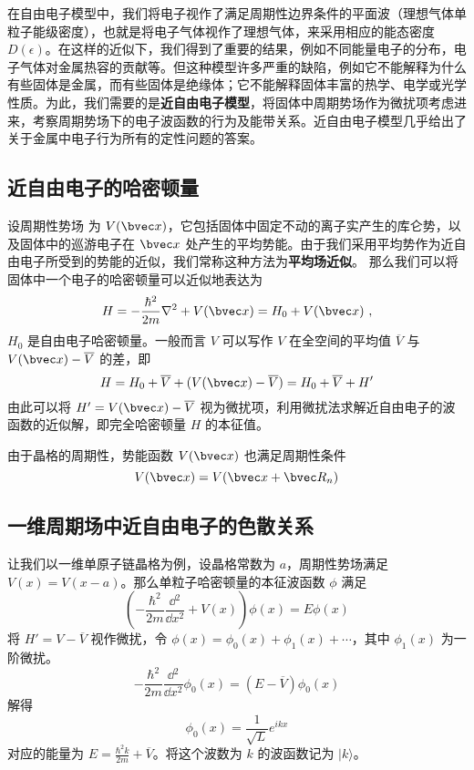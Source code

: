 

在自由电子模型中，我们将电子视作了满足周期性边界条件的平面波（理想气体单粒子能级密度），也就是将电子气体视作了理想气体，来采用相应的能态密度 $D(\epsilon)$。在这样的近似下，我们得到了重要的结果，例如不同能量电子的分布，电子气体对金属热容的贡献等。但这种模型许多严重的缺陷，例如它不能解释为什么有些固体是金属，而有些固体是绝缘体；它不能解释固体丰富的热学、电学或光学性质。为此，我们需要的是\textbf{近自由电子模型}，将固体中周期势场作为微扰项考虑进来，考察周期势场下的电子波函数的行为及能带关系。近自由电子模型几乎给出了关于金属中电子行为所有的定性问题的答案。
\subsection{近自由电子的哈密顿量}
设周期性势场 为 $V(\bvec x)$，它包括固体中固定不动的离子实产生的库仑势，以及固体中的巡游电子在 $\bvec x$ 处产生的平均势能。由于我们采用平均势作为近自由电子所受到的势能的近似，我们常称这种方法为\textbf{平均场近似}。
那么我们可以将固体中一个电子的哈密顿量可以近似地表达为
\begin{equation}
H=-\frac{\hbar^2}{2m}\nabla^2+V(\bvec x)=H_0+V(\bvec x)~,
\end{equation}
$H_0$ 是自由电子哈密顿量。一般而言 $V$ 可以写作 $V$ 在全空间的平均值 $\overline V$ 与 $V(\bvec x)-\overline V$ 的差，即
\begin{equation}
H=H_0+\overline V+(V(\bvec x)-\overline V)=H_0+\overline V+H'
\end{equation}
由此可以将 $H'=V(\bvec x)-\overline V$ 视为微扰项，利用微扰法求解近自由电子的波函数的近似解，即完全哈密顿量 $H$ 的本征值。

由于晶格的周期性，势能函数 $V(\bvec x)$ 也满足周期性条件
\begin{equation}
V(\bvec x)=V(\bvec x+\bvec R_n)
\end{equation}
\subsection{一维周期场中近自由电子的色散关系}
让我们以一维单原子链晶格为例，设晶格常数为 $a$，周期性势场满足 $V(x)=V(x-a)$。那么单粒子哈密顿量的本征波函数 $\phi$ 满足
\begin{equation}\label{eq_egasmd_1}
\left(-\frac{\hbar^2}{2m}\frac{\dd{}^2}{\dd x^2}+V(x)\right)\phi(x)=E\phi(x)
\end{equation}
将 $H'=V-\overline V$ 视作微扰，令 $\phi(x)=\phi_0(x)+\phi_1(x)+\cdots$，其中 $\phi_1(x)$ 为一阶微扰。
\begin{equation}
-\frac{\hbar^2}{2m}\frac{\dd{}^2}{\dd x^2} \phi_0(x)=(E-\overline V)\phi_0(x)
\end{equation}
解得
\begin{equation}
\phi_0(x)=\frac{1}{\sqrt{L}}e^{ikx}
\end{equation}
对应的能量为 $E=\frac{\hbar^2 k}{2m}+\overline V$。将这个波数为 $k$ 的波函数记为 $|k\rangle$。

